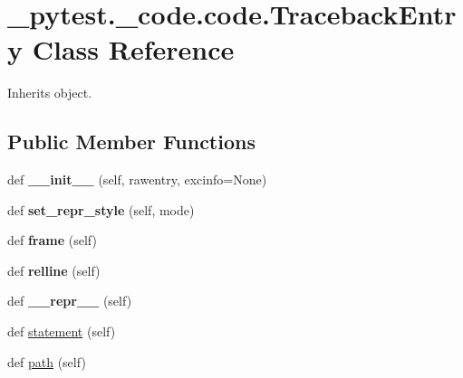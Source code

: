 \hypertarget{class__pytest_1_1__code_1_1code_1_1_traceback_entry}{}\section{\+\_\+pytest.\+\_\+code.\+code.\+Traceback\+Entry Class Reference}
\label{class__pytest_1_1__code_1_1code_1_1_traceback_entry}


Inherits object.

\subsection*{Public Member Functions}
\begin{DoxyCompactItemize}
\item 
\mbox{\label{class__pytest_1_1__code_1_1code_1_1_traceback_entry_a001bbcb2e16019ee808543ea5c581b55}} 
def {\bfseries \+\_\+\+\_\+init\+\_\+\+\_\+} (self, rawentry, excinfo=None)
\item 
\mbox{\label{class__pytest_1_1__code_1_1code_1_1_traceback_entry_a33206d2216f299f81ef669bb4be8e2e7}} 
def {\bfseries set\+\_\+repr\+\_\+style} (self, mode)
\item 
\mbox{\label{class__pytest_1_1__code_1_1code_1_1_traceback_entry_aa7ef56bb542971436a4d4201b25a77a0}} 
def {\bfseries frame} (self)
\item 
\mbox{\label{class__pytest_1_1__code_1_1code_1_1_traceback_entry_ac53bfa96a08fba3df946d09786b70739}} 
def {\bfseries relline} (self)
\item 
\mbox{\label{class__pytest_1_1__code_1_1code_1_1_traceback_entry_addebb61baa7f3c36c99128dfee0dcd19}} 
def {\bfseries \+\_\+\+\_\+repr\+\_\+\+\_\+} (self)
\item 
def \hyperlink{class__pytest_1_1__code_1_1code_1_1_traceback_entry_a83b5bccc0e0c4ce46f966497a9ae38b7}{statement} (self)
\item 
def \hyperlink{class__pytest_1_1__code_1_1code_1_1_traceback_entry_a844870165e187cb721e9772157f6472f}{path} (self)

\end{DoxyCompactItemize}
